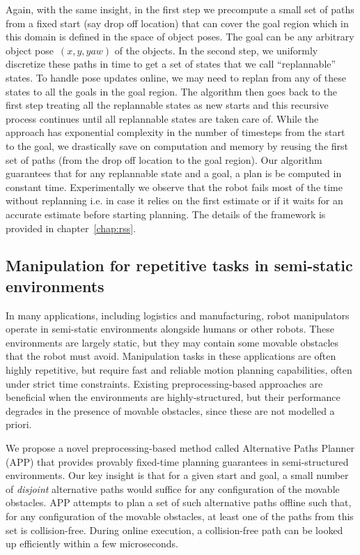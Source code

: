 \documentclass[a4paper]{report}
\begin{document}
Again, with the same insight, in the first step we precompute a small set of paths from a fixed start (say drop off location) that can cover the goal region which in this domain is defined in the space of object poses. The goal can be any arbitrary object pose~$(x,y,yaw)$ of the objects. In the second step, we uniformly discretize these paths in time to get a set of states that we call ``replannable'' states. To handle pose updates online, we may need to replan from any of these states to all the goals in the goal region. The algorithm then goes back to the first step treating all the replannable states as new starts and this recursive process continues until all replannable states are taken care of. While the approach has exponential complexity in the number of timesteps from the start to the goal, we drastically save on computation and memory by reusing the first set of paths (from the drop off location to the goal region). Our algorithm guarantees that for any replannable state and a goal, a plan is be computed in constant time. Experimentally we observe that the robot fails most of the time without replanning i.e. in case it relies on the first estimate or if it waits for an accurate estimate before starting planning. The details of the framework is provided in chapter~\ref{chap:rss}.

\subsection{Manipulation for repetitive tasks in semi-static environments}
In many applications, including logistics and manufacturing, robot manipulators operate in semi-static environments alongside humans or other robots. These environments are largely static, but they may contain some movable obstacles that the robot must avoid. Manipulation tasks in these applications are often highly repetitive, but require fast and reliable motion planning capabilities, often under strict time constraints. Existing preprocessing-based approaches are beneficial when the environments are highly-structured, but their performance degrades in the presence of movable obstacles, since these are not modelled a priori.

We propose a novel preprocessing-based method called Alternative Paths Planner (APP) that provides provably fixed-time planning guarantees in semi-structured environments. Our key insight is that for a given start and goal, a small number of \emph{disjoint} alternative paths would suffice for any configuration of the movable obstacles. APP attempts to plan a set of such alternative paths offline such that, for any configuration of the movable obstacles, at least one of the paths from this set is collision-free. During online execution, a collision-free path can be looked up efficiently within a few microseconds. 
\end{document}
